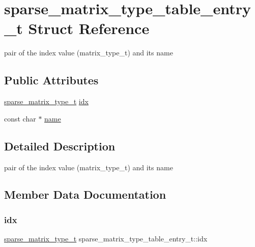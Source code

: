 \hypertarget{structsparse__matrix__type__table__entry__t}{}\section{sparse\+\_\+matrix\+\_\+type\+\_\+table\+\_\+entry\+\_\+t Struct Reference}
\label{structsparse__matrix__type__table__entry__t}


pair of the index value (matrix\+\_\+type\+\_\+t) and its name  


\subsection*{Public Attributes}
\begin{DoxyCompactItemize}
\item 
\hyperlink{spmv_8cc_a43a568fb26bc32aeaad07769cc524c45}{sparse\+\_\+matrix\+\_\+type\+\_\+t} \hyperlink{structsparse__matrix__type__table__entry__t_ae1bbdced2595c2b2e92a75b551631fc4}{idx}
\item 
const char $\ast$ \hyperlink{structsparse__matrix__type__table__entry__t_a7e2dea3171064e4ffece2e2c8a88c9ce}{name}
\end{DoxyCompactItemize}


\subsection{Detailed Description}
pair of the index value (matrix\+\_\+type\+\_\+t) and its name 

\subsection{Member Data Documentation}
\mbox{\label{structsparse__matrix__type__table__entry__t_ae1bbdced2595c2b2e92a75b551631fc4}} 
\subsubsection{\texorpdfstring{idx}{idx}}
{\footnotesize\ttfamily \hyperlink{spmv_8cc_a43a568fb26bc32aeaad07769cc524c45}{sparse\+\_\+matrix\+\_\+type\+\_\+t} sparse\+\_\+matrix\+\_\+type\+\_\+table\+\_\+entry\+\_\+t\+::idx}

